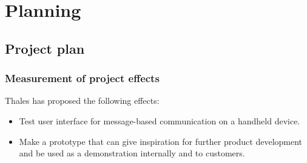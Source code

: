 \chapter{Planning}

\section{Project plan}

\subsection{Measurement of project effects}

Thales has proposed the following effects:
\begin{itemize}
\item{}Test user interface for message-based communication on a handheld device.
\item{}Make a prototype that can give inspiration for further product development and be used as a demonstration internally and to customers.
\end{itemize}
